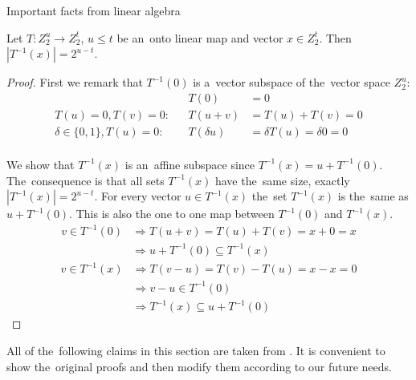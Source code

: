 \begin{section}{Important facts from linear algebra}

\begin{lemma}
\label{lemma-linear-transformation-domain-distribution}
Let $T: Z_2^u \rightarrow Z_2^t$, $u \leq t$ be an~onto linear map and vector $x \in Z_2^t$. Then $|T^{-1}(x)| = 2 ^ {u-t}$.
\end{lemma}
\begin{proof}
First we remark that $T^{-1}(0)$ is a~vector subspace of the~vector space $Z_2^u$:
\begin{align*}
&\textit{}& T(0) & = 0 \\
T(u) = 0, T(v) = 0: &\textit{}& T(u + v) & = T(u) + T(v) = 0 \\
\delta \in \lbrace 0, 1 \rbrace, T(u) = 0: &\textit{}& T(\delta u) & = \delta T(u) = \delta 0 = 0 \\
\end{align*}

We show that $T^{-1}(x)$ is an~affine subspace since $T^{-1}(x) = u + T^{-1}(0)$. The~consequence is that all sets $T^{-1}(x)$ have the~same size, exactly $|T^{-1}(x)| = 2^{u-t}$. For every vector $u \in T^{-1}(x)$ the~set $T^{-1}(x)$ is the~same as $u + T^{-1}(0)$. This is also the one to one map between $T^{-1}(0)$ and $T^{-1}(x)$.
\begin{displaymath}
\begin{split}
v \in T^{-1}(0) 
	& \Rightarrow T(u+v) = T(u) + T(v) = x + 0 = x  \\
	& \Rightarrow u + T^{-1}(0) \subseteq T^{-1}(x)
\end{split}
\end{displaymath}
\begin{displaymath}
\begin{split}
v \in T^{-1}(x) 
	& \Rightarrow T(v-u) = T(v) - T(u) = x - x = 0 \\
	& \Rightarrow v - u \in T^{-1}(0) \\
	& \Rightarrow T^{-1}(x) \subseteq u + T^{-1}(0)
\end{split}
\end{displaymath}
\end{proof}

\end{section}

All of the~following claims in this section are taken from \cite{DBLP:journals/jacm/AlonDMPT99}. It is convenient to show the~original proofs and then modify them according to our future needs.

